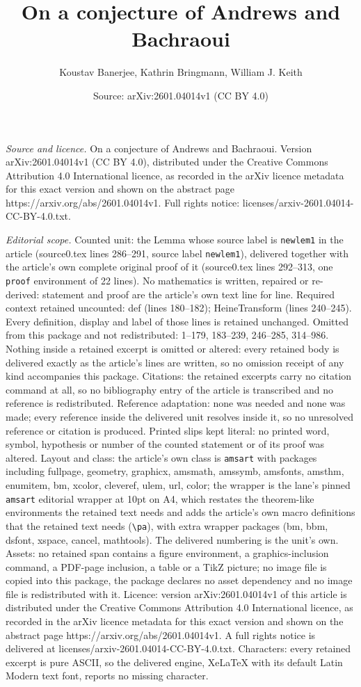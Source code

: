 \documentclass[10pt,a4paper]{amsart}
\title[On a conjecture of Andrews and Bachraoui]{On a conjecture of Andrews and Bachraoui}
\author{Koustav Banerjee, Kathrin Bringmann, William J. Keith}
\date{Source: arXiv:2601.04014v1 (CC BY 4.0)}
\begin{document}
\maketitle

\noindent\emph{Source and licence.} On a conjecture of Andrews and Bachraoui. Version arXiv:2601.04014v1 (CC BY 4.0), distributed under the Creative Commons Attribution 4.0 International licence, as recorded in the arXiv licence metadata for this exact version and shown on the abstract page https://arxiv.org/abs/2601.04014v1. Full rights notice: licenses/arxiv-2601.04014-CC-BY-4.0.txt.\par\smallskip

\noindent\textit{Editorial scope.} Counted unit: the Lemma whose source label is \texttt{newlem1} in the article (source0.tex lines 286--291, source label \texttt{newlem1}), delivered together with the article's own complete original proof of it (source0.tex lines 292--313, one \texttt{proof} environment of 22 lines). No mathematics is written, repaired or re-derived: statement and proof are the article's own text line for line. Required context retained uncounted: def (lines 180--182); HeineTransform (lines 240--245). Every definition, display and label of those lines is retained unchanged. Omitted from this package and not redistributed: 1--179, 183--239, 246--285, 314--986. Nothing inside a retained excerpt is omitted or altered: every retained body is delivered exactly as the article's lines are written, so no omission receipt of any kind accompanies this package. Citations: the retained excerpts carry no citation command at all, so no bibliography entry of the article is transcribed and no reference is redistributed. Reference adaptation: none was needed and none was made; every reference inside the delivered unit resolves inside it, so no unresolved reference or citation is produced. Printed slips kept literal: no printed word, symbol, hypothesis or number of the counted statement or of its proof was altered. Layout and class: the article's own class is \texttt{amsart} with packages including fullpage, geometry, graphicx, amsmath, amssymb, amsfonts, amsthm, enumitem, bm, xcolor, cleveref, ulem, url, color; the wrapper is the lane's pinned \texttt{amsart} editorial wrapper at 10pt on A4, which restates the theorem-like environments the retained text needs and adds the article's own macro definitions that the retained text needs (\texttt{\textbackslash pa}), with extra wrapper packages (bm, bbm, dsfont, xspace, cancel, mathtools). The delivered numbering is the unit's own. Assets: no retained span contains a figure environment, a graphics-inclusion command, a PDF-page inclusion, a table or a TikZ picture; no image file is copied into this package, the package declares no asset dependency and no image file is redistributed with it. Licence: version arXiv:2601.04014v1 of this article is distributed under the Creative Commons Attribution 4.0 International licence, as recorded in the arXiv licence metadata for this exact version and shown on the abstract page https://arxiv.org/abs/2601.04014v1. A full rights notice is delivered at licenses/arxiv-2601.04014-CC-BY-4.0.txt. Characters: every retained excerpt is pure ASCII, so the delivered engine, XeLaTeX with its default Latin Modern text font, reports no missing character.
\end{document}
